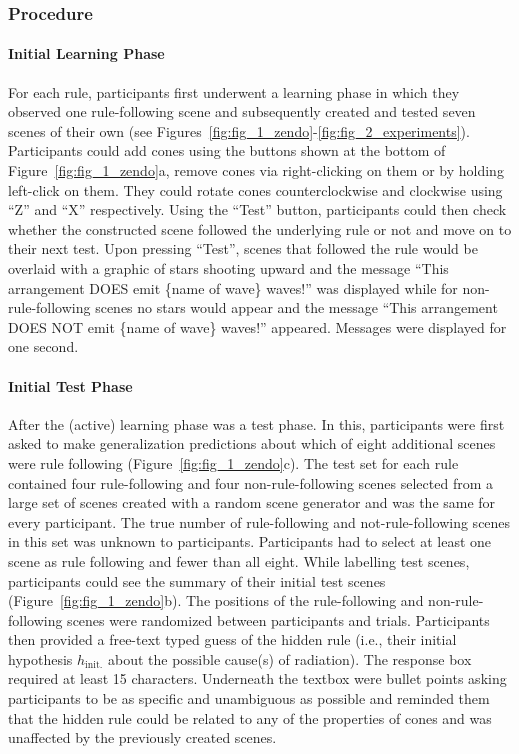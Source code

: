\documentclass[doc,natbib,floatsintext]{apa7}
\newcommand{\hi}{h_{\mathrm{init.}}}
\begin{document}
\subsubsection{Procedure}
\paragraph{Initial Learning Phase} For each rule, participants first underwent a learning phase in which they observed one rule-following scene and subsequently created and tested seven scenes of their own (see Figures~\ref{fig:fig_1_zendo}-\ref{fig:fig_2_experiments}). Participants could add cones using the buttons shown at the bottom of Figure~\ref{fig:fig_1_zendo}a, remove cones via right-clicking on them or by holding left-click on them. They could rotate cones counterclockwise and clockwise using  ``Z'' and ``X'' respectively. Using the ``Test'' button, participants could then check whether the constructed scene followed the underlying rule or not and move on to their next test. Upon pressing ``Test'', scenes that followed the rule would be overlaid with a graphic of stars shooting upward and the message ``This arrangement DOES emit \{name of wave\} waves!'' was displayed while for non-rule-following scenes no stars would appear and the message ``This arrangement DOES NOT emit \{name of wave\} waves!'' appeared. Messages were displayed for one second. 


\paragraph{Initial Test Phase} 
After the (active) learning phase was a test phase. In this, participants were first asked to make generalization predictions about which of eight additional scenes were rule following (Figure~\ref{fig:fig_1_zendo}c). The test set for each rule contained four rule-following and four non-rule-following scenes selected from a large set of scenes created with a random scene generator and was the same for every participant. The true number of rule-following and not-rule-following scenes in this set was unknown to participants. 
Participants had to select at least one scene as rule following and fewer than all eight. While labelling test scenes, participants could see the summary of their initial test scenes (Figure~\ref{fig:fig_1_zendo}b). The positions of the rule-following and non-rule-following scenes were randomized between participants and trials. Participants then provided a free-text typed guess of the hidden rule (i.e., their initial hypothesis $\hi$ about the possible cause(s) of radiation). The response box required at least 15 characters. Underneath the textbox were bullet points asking participants to be as specific and unambiguous as possible and reminded them that the hidden rule could be related to any of the properties of cones and was unaffected by the previously created scenes.
\end{document}
